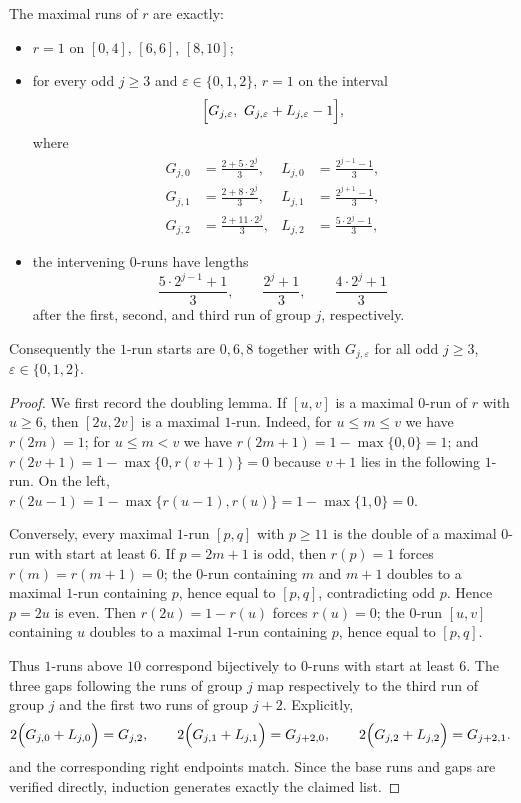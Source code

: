 \begin{corollary}\label{cor:C runs}
The maximal runs of $r$ are exactly:
\begin{itemize}\itemsep0.1em
\item $r=1$ on $[0,4]$, $[6,6]$, $[8,10]$;
\item for every odd $j\ge3$ and $\varepsilon\in\{0,1,2\}$, $r=1$ on the interval
\[
\Bigl[G_{j,\varepsilon},\ G_{j,\varepsilon}+L_{j,\varepsilon}-1\Bigr],
\]
where
\begin{align*}
G_{j,0}&=\frac{2+5\cdot2^{j}}{3}, & L_{j,0}&=\frac{2^{j-1}-1}{3},\\
G_{j,1}&=\frac{2+8\cdot2^{j}}{3}, & L_{j,1}&=\frac{2^{j+1}-1}{3},\\
G_{j,2}&=\frac{2+11\cdot2^{j}}{3}, & L_{j,2}&=\frac{5\cdot2^{j}-1}{3},
\end{align*}
\item the intervening $0$-runs have lengths
\[
\frac{5\cdot2^{j-1}+1}{3},\qquad \frac{2^{j}+1}{3},\qquad \frac{4\cdot2^{j}+1}{3}
\]
after the first, second, and third run of group $j$, respectively.
\end{itemize}
Consequently the $1$-run starts are $0,6,8$ together with $G_{j,\varepsilon}$ for all odd $j\ge3$, $\varepsilon\in\{0,1,2\}$.
\end{corollary}
\begin{proof}
We first record the doubling lemma. If $[u,v]$ is a maximal $0$-run of $r$ with $u\ge6$, then $[2u,2v]$ is a maximal $1$-run. Indeed, for $u\le m\le v$ we have $r(2m)=1$; for $u\le m<v$ we have $r(2m+1)=1-\max\{0,0\}=1$; and $r(2v+1)=1-\max\{0,r(v+1)\}=0$ because $v+1$ lies in the following $1$-run. On the left, $r(2u-1)=1-\max\{r(u-1),r(u)\}=1-\max\{1,0\}=0$.

Conversely, every maximal $1$-run $[p,q]$ with $p\ge11$ is the double of a maximal $0$-run with start at least $6$. If $p=2m+1$ is odd, then $r(p)=1$ forces $r(m)=r(m+1)=0$; the $0$-run containing $m$ and $m+1$ doubles to a maximal $1$-run containing $p$, hence equal to $[p,q]$, contradicting odd $p$. Hence $p=2u$ is even. Then $r(2u)=1-r(u)$ forces $r(u)=0$; the $0$-run $[u,v]$ containing $u$ doubles to a maximal $1$-run containing $p$, hence equal to $[p,q]$.

Thus $1$-runs above $10$ correspond bijectively to $0$-runs with start at least $6$. The three gaps following the runs of group $j$ map respectively to the third run of group $j$ and the first two runs of group $j+2$. Explicitly,
\[
2\Bigl(G_{j,0}+L_{j,0}\Bigr)=G_{j,2},\qquad
2\Bigl(G_{j,1}+L_{j,1}\Bigr)=G_{j+2,0},\qquad
2\Bigl(G_{j,2}+L_{j,2}\Bigr)=G_{j+2,1}.
\]
and the corresponding right endpoints match. Since the base runs and gaps are verified directly, induction generates exactly the claimed list.
\end{proof}

